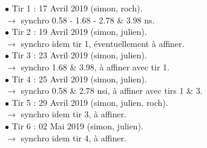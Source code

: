\documentclass{report}
\begin{document}
\noindent $\bullet$ Tir 1 : 17 Avril 2019 (simon, roch).\\
\noindent $\rightarrow$ synchro 0.58 - 1.68 - 2.78 \& 3.98 ns.\\
\noindent $\bullet$ Tir 2 : 19 Avril 2019 (simon, julien).\\
\noindent $\rightarrow$ synchro idem tir 1, \'eventuellement \`a affiner.\\
\noindent $\bullet$ Tir 3 : 23 Avril 2019 (simon, julien).\\
\noindent $\rightarrow$ synchro 1.68 \& 3.98, \`a affiner avec tir 1.\\
\noindent $\bullet$ Tir 4 : 25 Avril 2019 (simon, julien).\\
\noindent $\rightarrow$ synchro 0.58 \& 2.78 nsi, \`a affiner avec tirs 1 \& 3.\\
\noindent $\bullet$ Tir 5 : 29 Avril 2019 (simon, julien, roch).\\
\noindent $\rightarrow$ synchro idem tir 3, \`a affiner.\\
\noindent $\bullet$ Tir 6 : 02 Mai 2019 (simon, julien).\\
\noindent $\rightarrow$ synchro idem tir 4, \`a affiner.\\
\end{document}
